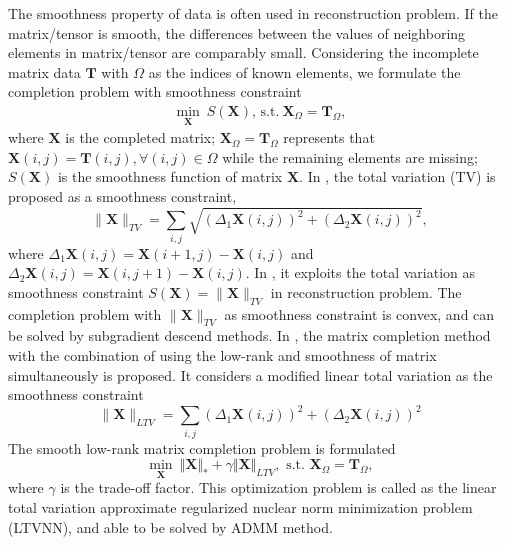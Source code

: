 \documentclass[12pt, draftcls, onecolumn]{IEEEtran}
\theoremstyle{plain}
\theoremstyle{definition}
\theoremstyle{remark}
\newcommand{\nt}[1]{\textcolor{red}{\textbf{[#1]}}}
\begin{document}
The smoothness property of data is often used in reconstruction problem.
If the matrix/tensor is smooth, the differences between the values of neighboring elements in matrix/tensor are comparably small.
Considering the incomplete matrix data $\mathbf{T}$ with $\Omega$ as the indices of known elements, we formulate the completion problem with smoothness constraint
\begin{equation}
\begin{aligned}
    \min_{\mathbf{X}}\ S(\mathbf{X})\text{, s.t.}\ \mathbf{X}_\Omega = \mathbf{T}_\Omega,
\end{aligned}    
\end{equation}
where $\mathbf{X}$ is the completed matrix;
$\mathbf{X}_\Omega=\mathbf{T}_\Omega$ represents that $\mathbf{X}(i,j)=\mathbf{T}(i,j),\forall (i,j)\in \Omega$ while the remaining elements are missing;
$S(\mathbf{X})$ is the smoothness function of matrix $\mathbf{X}$.
In \cite{Rudin:1992:NTV:142273.142312}, the total variation (TV) is proposed as a smoothness constraint,
\begin{equation}
    \lVert\mathbf{X}\rVert_{TV} = \sum_{i,j}\sqrt{(\Delta_1\mathbf{X}(i,j))^2+(\Delta_2\mathbf{X}(i,j))^2},
\end{equation}
where $\Delta_1\mathbf{X}(i,j)=\mathbf{X}(i+1,j)-\mathbf{X}(i,j)$ and $\Delta_2\mathbf{X}(i,j)=\mathbf{X}(i,j+1)-\mathbf{X}(i,j)$.
In \cite{DBLP:journals/corr/abs-0906-1487}, it exploits the total variation as smoothness constraint $S(\mathbf{X})=\lVert\mathbf{X}\rVert_{TV}$ in reconstruction problem.
The completion problem with $\lVert\mathbf{X}\rVert_{TV}$ as smoothness constraint is convex, and can be solved by subgradient descend methods.
In \cite{XuHan2014}, the matrix completion method with the combination of using the low-rank and smoothness of matrix simultaneously is proposed.
It considers a modified linear total variation as the smoothness constraint
\begin{equation}
\label{LTV}
\lVert\mathbf{X}\rVert_{LTV} = \sum_{i,j}{(\Delta_1\mathbf{X}(i,j))^2+(\Delta_2\mathbf{X}(i,j))^2}
\end{equation}
The smooth low-rank matrix completion problem is formulated 
\begin{equation}
	\min_{\mathbf{X}}\ \Vert\mathbf{X}\Vert_* + \gamma \Vert\mathbf{X}\Vert_{LTV},\text{ s.t. }\mathbf{X}_{\Omega}=\mathbf{T}_{\Omega},
\end{equation}
where $\gamma$ is the trade-off factor.
This optimization problem is called as the linear total variation approximate regularized nuclear norm minimization problem (LTVNN), and able to be solved by ADMM method.
\end{document}
